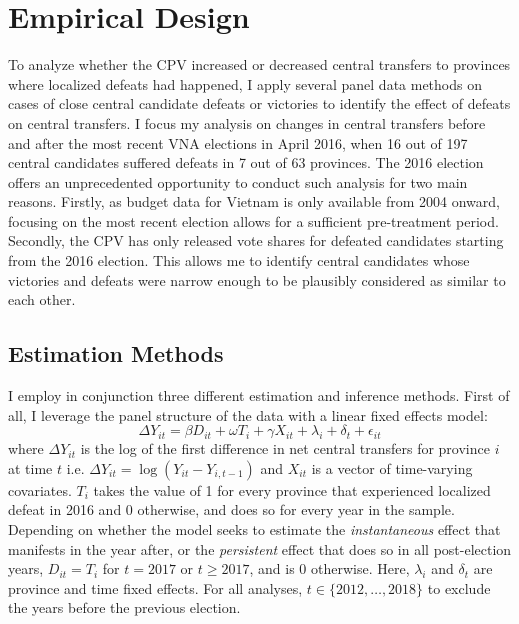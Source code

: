 \documentclass[12pt]{article}
\newcommand\fnote[1]{\footnote{\baselineskip=2\normalbaselineskip#1}}
\newcommand{\1}{\mathbbm{1}}
\begin{document}
\section{Empirical Design}
\label{sec:methods}

To analyze whether the CPV increased or decreased central transfers to provinces where localized defeats had happened, I apply several panel data methods on cases of close central candidate defeats or victories to identify the effect of defeats on central transfers. I focus my analysis on changes in central transfers before and after the most recent VNA elections in April 2016, when 16 out of 197 central candidates suffered defeats in 7 out of 63 provinces. The 2016 election offers an unprecedented opportunity to conduct such analysis for two main reasons. Firstly, as budget data for Vietnam is only available from 2004 onward, focusing on the most recent election allows for a sufficient pre-treatment period. Secondly, the CPV has only released vote shares for defeated candidates starting from the 2016 election. This allows me to identify central candidates whose victories and defeats were narrow enough to be plausibly considered as similar to each other.

\subsection{Estimation Methods}
\label{sec:methods_estimation}
I employ in conjunction three different estimation and inference methods. First of all, I leverage the panel structure of the data with a linear fixed effects model:
\begin{equation}
\Delta Y_{it} = \beta D_{it} + \omega T_{i} + \gamma X_{it} + \lambda_i + \delta_t + \epsilon_{it} \label{eq:FE}
\end{equation}
where $\Delta Y_{it}$ is the log of the first difference in net central transfers for province $i$ at time $t$ i.e. $\Delta Y_{it} = \log(Y_{it} - Y_{i, t-1})$ and $X_{it}$ is a vector of time-varying covariates. $T_{i}$ takes the value of 1 for every province that experienced localized defeat in 2016 and 0 otherwise, and does so for every year in the sample. Depending on whether the model seeks to estimate the \textit{instantaneous} effect that manifests in the year after, or the \textit{persistent} effect that does so in all post-election years, $D_{it} = T_{i}$ for $t=2017$ or $t\geq2017$, and is  $0$ otherwise. %
Here, $\lambda_i$ and $\delta_t$ are province and time fixed effects. For all analyses, $t \in \{2012, \ldots, 2018\}$ to exclude the years before the previous election.
\end{document}
